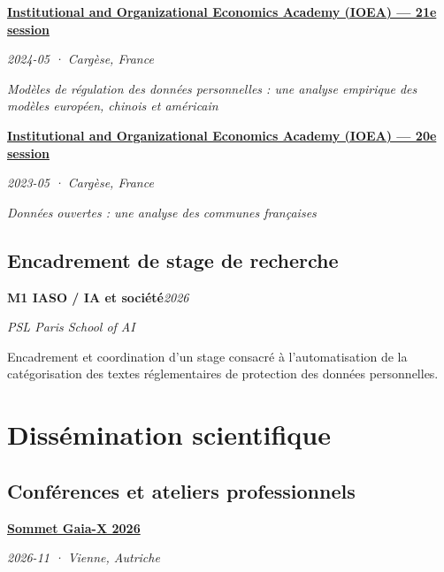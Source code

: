 \documentclass[11pt,a4paper]{article}
\newlength{\cvindent}
\let\cvoldsection\section
\renewcommand{\section}[1]{\Needspace{5\baselineskip}\cvoldsection{#1}}
\newenvironment{cvblock}[1][1]{%
  \par\noindent\hspace*{#1\cvindent}%
  \begin{minipage}{\dimexpr\linewidth-#1\cvindent\relax}%
}{%
  \end{minipage}\par
}
\newenvironment{cvdetails}{%
  \begin{list}{}{%
    \setlength{\leftmargin}{\cvindent}%
    \setlength{\rightmargin}{0pt}%
    \setlength{\topsep}{0.1em}%
    \setlength{\partopsep}{0pt}%
    \setlength{\parsep}{0.05em}%
    \setlength{\itemsep}{0pt}%
  }\item[]\small\ignorespaces
}{%
  \end{list}
}
\begin{document}
\begin{cvblock}[2]
\textbf{\href{https://www.ioea.eu/}{Institutional and Organizational Economics Academy (IOEA) --- 21e session}}\par
\begin{cvdetails}
{\small\itshape 2024-05 · Cargèse, France}\par
\textit{Modèles de régulation des données personnelles : une analyse empirique des modèles européen, chinois et américain}\par
\end{cvdetails}
\end{cvblock}\par\vspace{0.35em}

\begin{cvblock}[2]
\textbf{\href{https://www.ioea.eu/}{Institutional and Organizational Economics Academy (IOEA) --- 20e session}}\par
\begin{cvdetails}
{\small\itshape 2023-05 · Cargèse, France}\par
\textit{Données ouvertes : une analyse des communes françaises}\par
\end{cvdetails}
\end{cvblock}\par\vspace{0.35em}

\subsection*{Encadrement de stage de recherche}
\begin{cvblock}[2]
\textbf{M1 IASO / IA et société}\hfill\textit{2026}\par
\begin{cvdetails}
{\small\itshape PSL Paris School of AI}\par
Encadrement et coordination d'un stage consacré à l'automatisation de la catégorisation des textes réglementaires de protection des données personnelles.
\end{cvdetails}
\end{cvblock}\par

\section{Dissémination scientifique}
\subsection*{Conférences et ateliers professionnels}
\begin{cvblock}[2]
\textbf{\href{https://gaia-x.eu/summit-2026/}{Sommet Gaia-X 2026}}\par
\begin{cvdetails}
{\small\itshape 2026-11 · Vienne, Autriche}\par
\end{cvdetails}
\end{cvblock}\par\vspace{0.35em}
\end{document}
